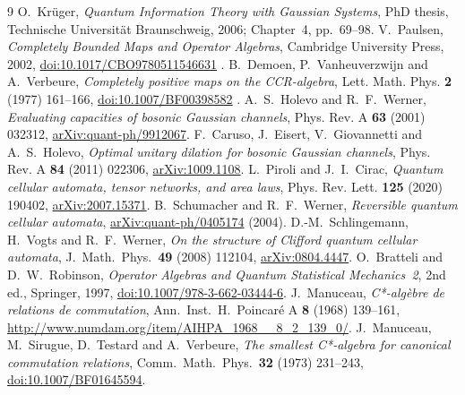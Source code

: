 \clearpage
{}
\begin{thebibliography}{9}
O.~Kr\"uger, \emph{Quantum Information Theory with Gaussian Systems}, PhD thesis, Technische
Universit\"at Braunschweig, 2006; Chapter~4, pp.~69--98.
V.~Paulsen, \emph{Completely Bounded Maps and Operator Algebras}, Cambridge University Press, 2002,
\href{https://doi.org/10.1017/CBO9780511546631}{doi:10.1017/CBO9780511546631}
.
B.~Demoen, P.~Vanheuverzwijn and A.~Verbeure, \emph{Completely positive maps on the CCR-algebra},
Lett. Math. Phys. \textbf{2} (1977) 161--166,
\href{https://doi.org/10.1007/BF00398582}{doi:10.1007/BF00398582} .
A.~S.~Holevo and R.~F.~Werner, \emph{Evaluating capacities of bosonic Gaussian channels},
Phys. Rev. A \textbf{63} (2001) 032312,
\href{https://arxiv.org/abs/quant-ph/9912067}{arXiv:quant-ph/9912067}.
F.~Caruso, J.~Eisert, V.~Giovannetti and A.~S.~Holevo, \emph{Optimal unitary dilation for bosonic
Gaussian channels}, Phys. Rev. A \textbf{84} (2011) 022306,
\href{https://arxiv.org/abs/1009.1108}{arXiv:1009.1108}.
L.~Piroli and J.~I.~Cirac, \emph{Quantum cellular automata, tensor networks, and area laws},
Phys. Rev. Lett. \textbf{125} (2020) 190402,
\href{https://arxiv.org/abs/2007.15371}{arXiv:2007.15371}.
B.~Schumacher and R.~F.~Werner, \emph{Reversible quantum cellular automata},
\href{https://arxiv.org/abs/quant-ph/0405174}{arXiv:quant-ph/0405174} (2004).
D.-M.~Schlingemann, H.~Vogts and R.~F.~Werner, \emph{On the structure of Clifford quantum cellular
automata}, J.\ Math.\ Phys.\ \textbf{49} (2008) 112104,
\href{https://arxiv.org/abs/0804.4447}{arXiv:0804.4447}.
O.~Bratteli and D.~W.~Robinson, \emph{Operator Algebras and Quantum Statistical Mechanics~2},
2nd ed., Springer, 1997,
\href{https://doi.org/10.1007/978-3-662-03444-6}{doi:10.1007/978-3-662-03444-6}.
J.~Manuceau, \emph{C*-alg\`ebre de relations de commutation}, Ann.\ Inst.\ H.\ Poincar\'e A
\textbf{8} (1968) 139--161, \url{http://www.numdam.org/item/AIHPA_1968__8_2_139_0/}.
J.~Manuceau, M.~Sirugue, D.~Testard and A.~Verbeure, \emph{The smallest C*-algebra for canonical
commutation relations}, Comm.\ Math.\ Phys.\ \textbf{32} (1973) 231--243,
\href{https://doi.org/10.1007/BF01645594}{doi:10.1007/BF01645594}.

\end{thebibliography}
